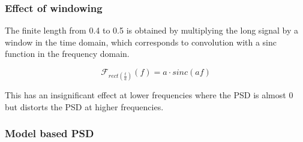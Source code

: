 \documentclass{article}
\begin{document}
\subsubsection{Effect of windowing}

The finite length from 0.4 to 0.5 is obtained by multiplying the long signal by a window in the time domain, which corresponds to convolution with a sinc function in the frequency domain.

\begin{equation*}
\mathcal{F}_{rect(\frac{t}{a})}(f)=a \cdot sinc(af)
\end{equation*}

This has an insignificant effect at lower frequencies where the PSD is almost 0 but distorts the PSD at higher frequencies.

\subsubsection{Model based PSD}
\end{document}
